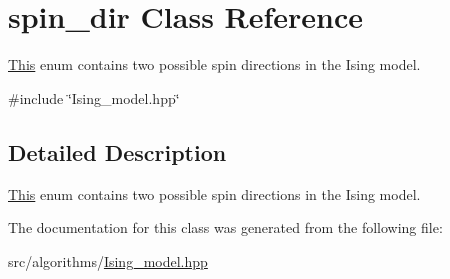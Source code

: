 \hypertarget{classspin__dir}{}\section{spin\+\_\+dir Class Reference}
\label{classspin__dir}


\mbox{\hyperlink{classThis}{This}} enum contains two possible spin directions in the Ising model.  




{\ttfamily \#include \char`\"{}Ising\+\_\+model.\+hpp\char`\"{}}



\subsection{Detailed Description}
\mbox{\hyperlink{classThis}{This}} enum contains two possible spin directions in the Ising model. 

The documentation for this class was generated from the following file\+:\begin{DoxyCompactItemize}
\item 
src/algorithms/\mbox{\hyperlink{Ising__model_8hpp}{Ising\+\_\+model.\+hpp}}\end{DoxyCompactItemize}
